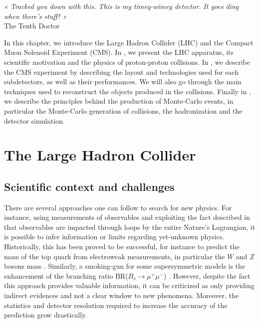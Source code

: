\setcounter{mtc}{3}
\vspace*{-0.7cm}
\hspace*{0.39\textwidth}
\begin{minipage}{0.6\textwidth}
\emph{« Tracked you down with this. This is my timey-wimey detector. It goes
ding when there’s stuff! »}\\
\hspace*{0.6\textwidth} The Tenth Doctor
\end{minipage}
\minitoc
\newpage

    In this chapter, we introduce the Large Hadron Collider (LHC) and the
    Compact Muon Solenoid Experiment (CMS). In , we
    present the LHC apparatus, its scientific motivation and the physics of
    proton-proton collisions. In , we describe the
    CMS experiment by describing the layout and technologies used for each
    subdetectors, as well as their performances. We will also go through the
    main techniques used to reconstruct the objects produced in the collisions.
    Finally in , we describe the principles behind the
    production of Monte-Carlo events, in particular the Monte-Carlo generation
    of collisions, the hadronization and the detector simulation.

    \section{The Large Hadron Collider \label{sec:LHCintro}}

    \subsection{Scientific context and challenges}

    There are several approaches one can follow to search for new physics. For
    instance, using measurements of observables and exploiting the fact
    described in  that observables are
    impacted through loops by the entire Nature's Lagrangian, it is possible to
    infer information or limits regarding yet-unknown physics. Historically,
    this has been proved to be successful, for instance to predict the mass of
    the top quark from electroweak measurements, in particular the $W$ and $Z$
    bosons mass \cite{discoveryOfTopQuark}. Similarly, a smoking-gun for some
    supersymmetric models is the enhancement of the branching ratio BR($B_s
    \rightarrow \mu^+\mu^-$) \cite{BsToMuMu}. However, despite the fact this
    approach provides valuable information, it can be criticized as only
    providing indirect evidences and not a clear window to new phenomena.
    Moreover, the statistics and detector resolution required to increase the
    accuracy of the prediction grow drastically.


